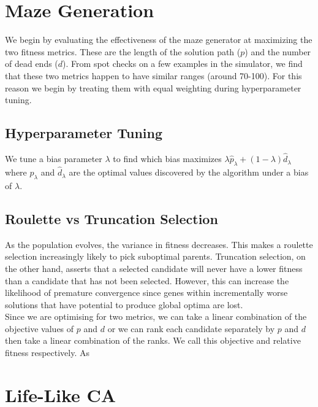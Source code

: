 \section{Maze Generation}

We begin by evaluating the effectiveness of the maze generator at maximizing the two fitness metrics. These are the length of the solution path ($p$) and the number of dead ends ($d$). From spot checks on a few examples in the simulator, we find that these two metrics happen to have similar ranges (around 70-100). For this reason we begin by treating them with equal weighting during hyperparameter tuning.\\

\subsection{Hyperparameter Tuning}

We tune a bias parameter $\lambda$ to find which bias maximizes $\lambda \hat{p}_\lambda + (1-\lambda)\hat{d}_\lambda$ where $ \hat{p}_\lambda$ and $\hat{d}_\lambda$ are the optimal values discovered by the algorithm under a bias of $\lambda$.\\


\subsection{Roulette vs Truncation Selection}

As the population evolves, the variance in fitness decreases. This makes a roulette selection increasingly likely to pick suboptimal parents. Truncation selection, on the other hand, asserts that a selected candidate will never have a lower fitness than a candidate that has not been selected. However, this can increase the likelihood of premature convergence since genes within incrementally worse solutions that have potential to produce global optima are lost.\\

Since we are optimising for two metrics, we can take a linear combination of the objective values of $p$ and $d$ or we can rank each candidate separately by $p$ and $d$ then take a linear combination of the ranks. We call this objective and relative fitness respectively. As

\section{Life-Like CA}

